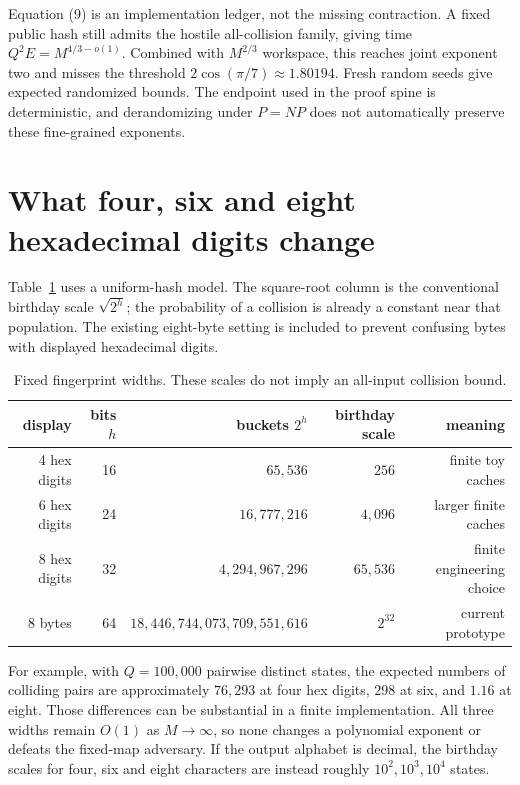 \documentclass[11pt]{article}
\newcommand{\gammats}{2\cos(\pi/7)}
\begin{document}
Equation (9) is an implementation ledger, not the missing contraction.  A
fixed public hash still admits the hostile all-collision family, giving time
$Q^2E=M^{4/3-o(1)}$.  Combined with $M^{2/3}$ workspace, this reaches joint
exponent two and misses the threshold $\gammats\approx1.80194$.  Fresh random
seeds give expected randomized bounds.  The endpoint used in the proof spine
is deterministic, and derandomizing under $P=NP$ does not automatically
preserve these fine-grained exponents.

\section{What four, six and eight hexadecimal digits change}
Table~\ref{tab:digits} uses a uniform-hash model.  The square-root column is
the conventional birthday scale $\sqrt{2^h}$; the probability of a collision
is already a constant near that population.  The existing eight-byte setting
is included to prevent confusing bytes with displayed hexadecimal digits.

\begin{table}[ht]
\centering
\begin{tabular}{rrrrr}
\toprule
display & bits $h$ & buckets $2^h$ & birthday scale & meaning\\
\midrule
4 hex digits & 16 & $65{,}536$ & $256$ & finite toy caches\\
6 hex digits & 24 & $16{,}777{,}216$ & $4{,}096$ & larger finite caches\\
8 hex digits & 32 & $4{,}294{,}967{,}296$ & $65{,}536$ & finite engineering choice\\
8 bytes & 64 & $18{,}446{,}744{,}073{,}709{,}551{,}616$ & $2^{32}$ & current prototype\\
\bottomrule
\end{tabular}
\caption{Fixed fingerprint widths.  These scales do not imply an all-input
collision bound.}
\label{tab:digits}
\end{table}

For example, with $Q=100{,}000$ pairwise distinct states, the expected
numbers of colliding pairs are approximately $76{,}293$ at four hex digits,
$298$ at six, and $1.16$ at eight.  Those differences can be substantial in
a finite implementation.  All three widths remain $O(1)$ as $M\to\infty$,
so none changes a polynomial exponent or defeats the fixed-map adversary.
If the output alphabet is decimal, the birthday scales for four, six and
eight characters are instead roughly $10^2,10^3,10^4$ states.
\end{document}
